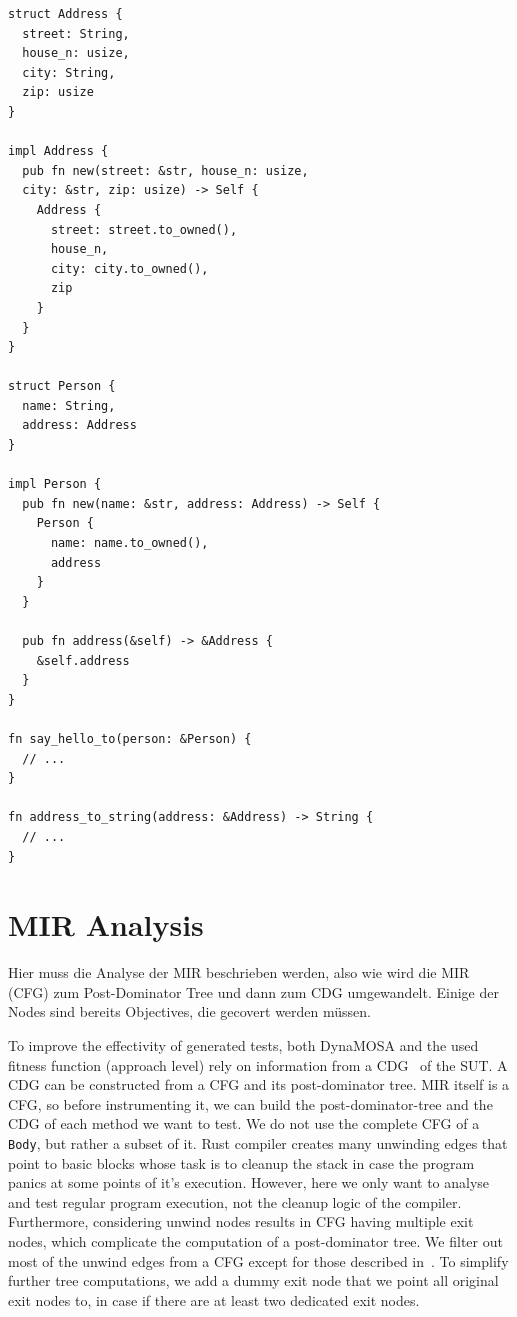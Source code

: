 \documentclass[paper=a4,%
  twoside,%
  BCOR4mm,%
  abstract=true,%
  toc=bibliography,%
  chapterprefix=true,%
  toc=bibliographynumbered,%
  open=right,%
  english,%
  pagesize=pdftex]{scrreprt}
\newcommand{\mir}{\ac{MIR}\xspace}
\newcommand{\cfg}{\ac{CFG}\xspace}
\newcommand{\sut}{\ac{SUT}\xspace}
\begin{document}
\begin{lstlisting}[style=boxed, caption={After HIR analysis, we know how a \texttt{Person} object can be generated to be used in \texttt{say\string_hello\string_to}.}, label=lst:hir-analysis-example]
struct Address {
  street: String,
  house_n: usize,
  city: String,
  zip: usize
}

impl Address {
  pub fn new(street: &str, house_n: usize,
  city: &str, zip: usize) -> Self {
    Address {
      street: street.to_owned(),
      house_n,
      city: city.to_owned(),
      zip
    }
  }
}

struct Person {
  name: String,
  address: Address
}

impl Person {
  pub fn new(name: &str, address: Address) -> Self {
    Person {
      name: name.to_owned(),
      address
    }
  }

  pub fn address(&self) -> &Address {
    &self.address
  }
}

fn say_hello_to(person: &Person) {
  // ...
}

fn address_to_string(address: &Address) -> String {
  // ...
}
\end{lstlisting}

\section{MIR Analysis}
Hier muss die Analyse der MIR beschrieben werden, also wie wird die MIR (CFG) zum Post-Dominator Tree und dann zum CDG umgewandelt. Einige der Nodes sind bereits Objectives, die gecovert werden müssen.

To improve the effectivity of generated tests, both DynaMOSA and the used fitness function (approach level) rely on information from a \ac{CDG}~\cite{Ferrante1987} of the \sut. A \ac{CDG} can be constructed from a \cfg and its post-dominator tree. \mir itself is a \cfg, so before instrumenting it, we can build the post-dominator-tree and the \ac{CDG} of each method we want to test. We do not use the complete \cfg of a \texttt{Body}, but rather a subset of it. Rust compiler creates many unwinding edges that point to basic blocks whose task is to cleanup the stack in case the program panics at some points of it's execution. However, here we only want to analyse and test regular program execution, not the cleanup logic of the compiler. Furthermore, considering unwind nodes results in \cfg having multiple exit nodes, which complicate the computation of a post-dominator tree. We filter out most of the unwind edges from a \cfg except for those described in~. To simplify further tree computations, we add a dummy exit node that we point all original exit nodes to, in case if there are at least two dedicated exit nodes. 
\end{document}
